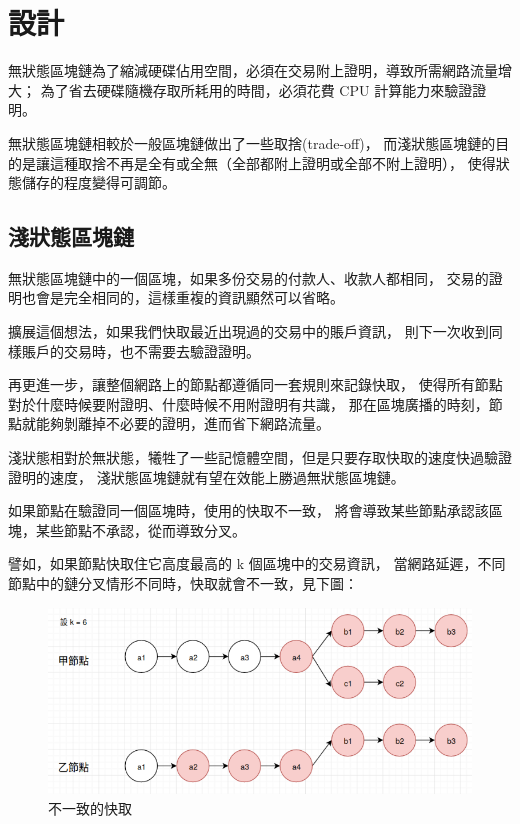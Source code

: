 \graphicspath{ {./images/} }
\chapter{設計}
\label{c:design}

無狀態區塊鏈為了縮減硬碟佔用空間，必須在交易附上證明，導致所需網路流量增大；
為了省去硬碟隨機存取所耗用的時間，必須花費 CPU 計算能力來驗證證明。

無狀態區塊鏈相較於一般區塊鏈做出了一些取捨(trade-off)，
而淺狀態區塊鏈的目的是讓這種取捨不再是全有或全無（全部都附上證明或全部不附上證明），
使得狀態儲存的程度變得可調節。

\section{淺狀態區塊鏈}

無狀態區塊鏈中的一個區塊，如果多份交易的付款人、收款人都相同，
交易的證明也會是完全相同的，這樣重複的資訊顯然可以省略。

擴展這個想法，如果我們快取最近出現過的交易中的賬戶資訊，
則下一次收到同樣賬戶的交易時，也不需要去驗證證明。

再更進一步，讓整個網路上的節點都遵循同一套規則來記錄快取，
使得所有節點對於什麼時候要附證明、什麼時候不用附證明有共識，
那在區塊廣播的時刻，節點就能夠剝離掉不必要的證明，進而省下網路流量。

淺狀態相對於無狀態，犧牲了一些記憶體空間，但是只要存取快取的速度快過驗證證明的速度，
淺狀態區塊鏈就有望在效能上勝過無狀態區塊鏈。


如果節點在驗證同一個區塊時，使用的快取不一致，
將會導致某些節點承認該區塊，某些節點不承認，從而導致分叉。

譬如，如果節點快取住它高度最高的 k 個區塊中的交易資訊，
當網路延遲，不同節點中的鏈分叉情形不同時，快取就會不一致，見下圖：

\begin{figure}[h]
\includegraphics[width=\textwidth]{wrong-cache}
\caption{不一致的快取}
\end{figure}

